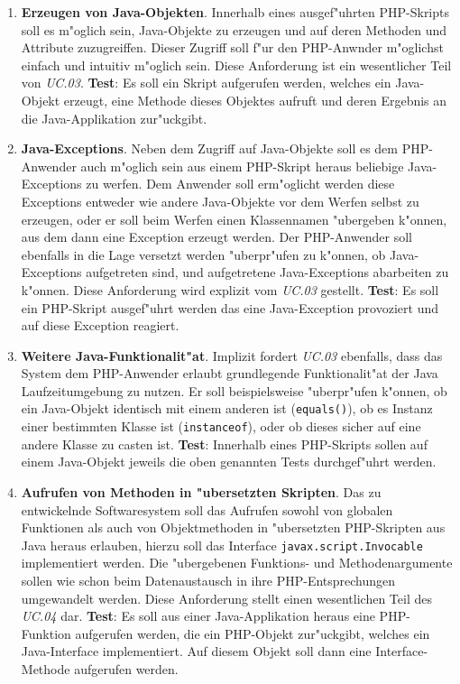 \begin{enumerate}
\item \textbf{Erzeugen von Java-Objekten}. Innerhalb eines ausgef"uhrten PHP-Skripts soll es m"oglich sein, Java-Objekte zu erzeugen und auf
    deren Methoden und Attribute zuzugreiffen. Dieser Zugriff soll f"ur den PHP-Anwnder m"oglichst einfach und intuitiv m"oglich sein.
    Diese Anforderung ist ein wesentlicher Teil von \emph{UC.03}.
    \textbf{Test}: Es soll ein Skript aufgerufen werden, welches ein Java-Objekt erzeugt, eine Methode dieses Objektes aufruft und
    deren Ergebnis an die Java-Applikation zur"uckgibt.

\item \textbf{Java-Exceptions}. Neben dem Zugriff auf Java-Objekte soll es dem PHP-Anwender auch m"oglich sein aus einem
    PHP-Skript heraus beliebige Java-Exceptions zu werfen. 
    Dem Anwender soll erm"oglicht werden diese Exceptions entweder wie andere Java-Objekte vor dem Werfen selbst zu erzeugen,
    oder er soll beim Werfen einen Klassennamen "ubergeben k"onnen, aus dem dann eine Exception erzeugt werden. 
    Der PHP-Anwender soll ebenfalls in die Lage versetzt werden 
    "uberpr"ufen zu k"onnen, ob Java-Exceptions aufgetreten sind, und aufgetretene Java-Exceptions abarbeiten zu k"onnen.
    Diese Anforderung wird explizit vom \emph{UC.03} gestellt.
    \textbf{Test}: Es soll ein PHP-Skript ausgef"uhrt werden das eine Java-Exception provoziert und auf diese Exception reagiert.

\item \textbf{Weitere Java-Funktionalit"at}. Implizit fordert \emph{UC.03} ebenfalls, dass das System dem PHP-Anwender erlaubt grundlegende
    Funktionalit"at der Java Laufzeitumgebung zu nutzen. Er soll beispielsweise "uberpr"ufen k"onnen, ob ein Java-Objekt identisch mit einem anderen ist
    (\texttt{equals()}), ob es Instanz einer bestimmten Klasse ist (\texttt{instanceof}), oder ob dieses sicher auf eine andere Klasse zu casten ist.
    \textbf{Test}: Innerhalb eines PHP-Skripts sollen auf einem Java-Objekt jeweils die oben genannten Tests durchgef"uhrt werden.

\item \textbf{Aufrufen von Methoden in "ubersetzten Skripten}. Das zu entwickelnde Softwaresystem soll das Aufrufen sowohl von globalen Funktionen
    als auch von Objektmethoden in "ubersetzten PHP-Skripten aus Java heraus erlauben, hierzu soll das Interface \texttt{javax.script.Invocable} 
    implementiert werden. Die "ubergebenen Funktions- und Methodenargumente sollen wie schon beim Datenaustausch in ihre PHP-Entsprechungen
    umgewandelt werden. Diese Anforderung stellt einen wesentlichen Teil des \emph{UC.04} dar.
    \textbf{Test}: Es soll aus einer Java-Applikation heraus eine PHP-Funktion aufgerufen werden, die ein PHP-Objekt zur"uckgibt, welches
    ein Java-Interface implementiert. Auf diesem Objekt soll dann eine Interface-Methode aufgerufen werden.


\end{enumerate}

